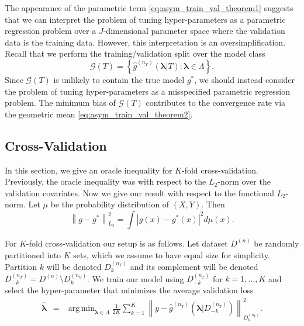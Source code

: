\documentclass[12pt]{article} %
\theoremstyle{definition}
\DeclareMathOperator*{\argmin}{arg\,min}
\begin{document}
The appearance of the parametric term \eqref{eq:asym_train_val_theorem1} suggests that we can interpret the problem of tuning hyper-parameters as a parametric regression problem over a $J$-dimensional parameter space where the validation data is the training data. However, this interpretation is an oversimplification. Recall that we perform the training/validation split over the model class
\begin{equation}
\mathcal{G}(T) = \left \{ \hat{g}^{(n_T)}( {\boldsymbol{\lambda}}| T) : \boldsymbol{\lambda} \in \Lambda \right \}.
\end{equation}
Since $\mathcal{G}(T)$ is unlikely to contain the true model $g^*$, we should instead consider the problem of tuning hyper-parameters as a misspecified parametric regression problem. The minimum bias of $\mathcal{G}(T)$ contributes to the convergence rate via the geometric mean \eqref{eq:asym_train_val_theorem2}.

\subsection{Cross-Validation}\label{sec:cv}

In this section, we give an oracle inequality for $K$-fold cross-validation.
Previously, the oracle inequality was with respect to the $L_2$-norm over the validation covariates.
Now we give our result with respect to the functional $L_2$-norm.
Let $\mu$ be the probability distribution of $(X,Y)$.
Then
\begin{equation}
\left \| g - g^* \right \|^2_{L_2} = \int \left |g(x) - g^*(x) \right |^2 d\mu(x).
\end{equation}

For $K$-fold cross-validation our setup is as follows. Let dataset $D^{(n)}$ be randomly partitioned into $K$ sets, which we assume to have equal size for simplicity. Partition $k$ will be denoted $D_k^{(n_V)}$ and its complement will be denoted $D_{-k}^{(n_T)} = D^{(n)} \setminus D_k^{(n_V)}$. We train our model using $D_{-k}^{(n_T)}$ for $k=1,...,K$ and select the hyper-parameter that minimizes the average validation loss
\begin{eqnarray}
\label{kfold_opt}
\hat{\boldsymbol \lambda} &=& \argmin_{\boldsymbol{\lambda} \in\Lambda} \frac{1}{2K} \sum_{k=1}^K  \left \| y-\hat{g}^{(n_T)}(\boldsymbol \lambda | D_{-k}^{(n_T)}) \right \|_{D_k^{(n_V)}}^{2}.
\end{eqnarray}
\end{document}
